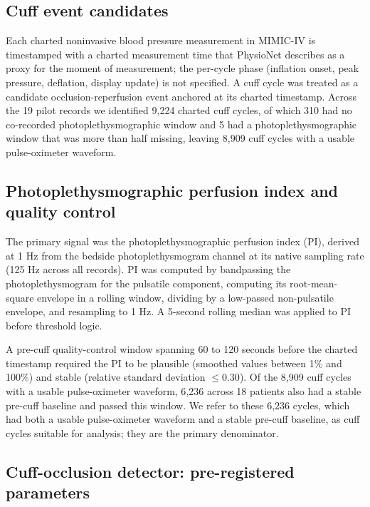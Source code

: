 \documentclass[twocolumn,letterpaper,10pt]{article}
\begin{document}
\subsection{Cuff event candidates}

Each charted noninvasive blood pressure measurement in MIMIC-IV is timestamped with a charted measurement time that PhysioNet describes as a proxy for the moment of measurement; the per-cycle phase (inflation onset, peak pressure, deflation, display update) is not specified.\cite{johnson2023_mimic4} A cuff cycle was treated as a candidate occlusion-reperfusion event anchored at its charted timestamp. Across the 19 pilot records we identified 9{,}224 charted cuff cycles, of which 310 had no co-recorded photoplethysmographic window and 5 had a photoplethysmographic window that was more than half missing, leaving 8{,}909 cuff cycles with a usable pulse-oximeter waveform.

\subsection{Photoplethysmographic perfusion index and quality control}

The primary signal was the photoplethysmographic perfusion index (PI), derived at 1 Hz from the bedside photoplethysmogram channel at its native sampling rate (125 Hz across all records). PI was computed by bandpassing the photoplethysmogram for the pulsatile component, computing its root-mean-square envelope in a rolling window, dividing by a low-passed non-pulsatile envelope, and resampling to 1 Hz. A 5-second rolling median was applied to PI before threshold logic.

A pre-cuff quality-control window spanning 60 to 120 seconds before the charted timestamp required the PI to be plausible (smoothed values between 1\% and 100\%) and stable (relative standard deviation $\leq 0.30$). Of the 8{,}909 cuff cycles with a usable pulse-oximeter waveform, 6{,}236 across 18 patients also had a stable pre-cuff baseline and passed this window. We refer to these 6{,}236 cycles, which had both a usable pulse-oximeter waveform and a stable pre-cuff baseline, as cuff cycles suitable for analysis; they are the primary denominator.

\subsection{Cuff-occlusion detector: pre-registered parameters}
\end{document}
